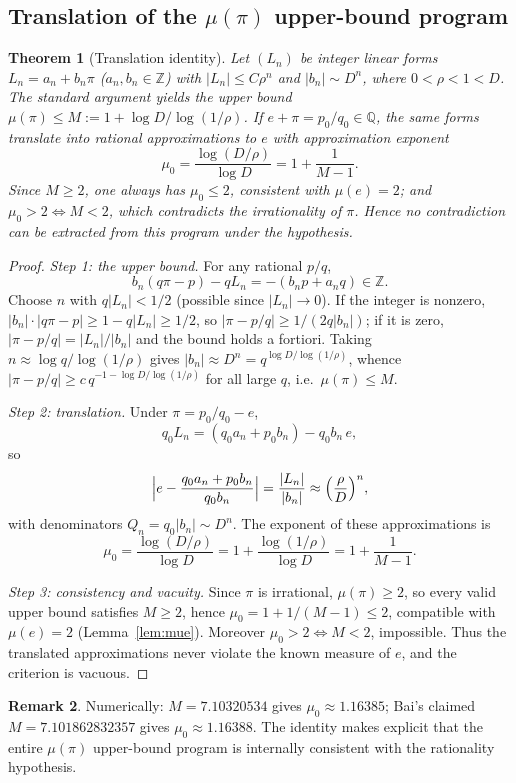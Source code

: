 \documentclass[11pt]{amsart}
\newtheorem{theorem}{Theorem}[section]
\theoremstyle{definition}
\newtheorem{remark}[theorem]{Remark}
\theoremstyle{remark}
\numberwithin{equation}{section}
\newcommand{\Q}{\mathbb{Q}}
\newcommand{\Z}{\mathbb{Z}}
\newcommand{\irr}{\mu}
\newcommand{\ee}{e}
\begin{document}
\subsection{Translation of the \texorpdfstring{$\irr(\pi)$}{mu(pi)} upper-bound program}

\begin{theorem}[Translation identity]\label{thm:translation}
Let $(L_n)$ be integer linear forms $L_n=a_n+b_n\pi$ ($a_n,b_n\in\Z$) with $|L_n|\le C\rho^n$ and $|b_n|\sim D^n$, where $0<\rho<1<D$. The standard argument yields the upper bound $\irr(\pi)\le M:=1+\log D/\log(1/\rho)$. If $e+\pi=p_0/q_0\in\Q$, the same forms translate into rational approximations to $\ee$ with approximation exponent
\[
\irr_0=\frac{\log(D/\rho)}{\log D}=1+\frac{1}{M-1}.
\]
Since $M\ge2$, one always has $\irr_0\le2$, consistent with $\irr(\ee)=2$; and $\irr_0>2\iff M<2$, which contradicts the irrationality of $\pi$. Hence no contradiction can be extracted from this program under the hypothesis.
\end{theorem}

\begin{proof}
\emph{Step 1: the upper bound.} For any rational $p/q$,
\[
b_n(q\pi-p)-qL_n=-(b_np+a_nq)\in\Z.
\]
Choose $n$ with $q|L_n|<1/2$ (possible since $|L_n|\to0$). If the integer is nonzero, $|b_n|\cdot|q\pi-p|\ge1-q|L_n|\ge1/2$, so $|\pi-p/q|\ge1/(2q|b_n|)$; if it is zero, $|\pi-p/q|=|L_n|/|b_n|$ and the bound holds a fortiori. Taking $n\approx\log q/\log(1/\rho)$ gives $|b_n|\approx D^n=q^{\log D/\log(1/\rho)}$, whence $|\pi-p/q|\ge c\,q^{-1-\log D/\log(1/\rho)}$ for all large $q$, i.e.\ $\irr(\pi)\le M$.

\emph{Step 2: translation.} Under $\pi=p_0/q_0-e$,
\[
q_0L_n=(q_0a_n+p_0b_n)-q_0b_n\,e,
\]
so
\[
\Bigl|e-\frac{q_0a_n+p_0b_n}{q_0b_n}\Bigr|=\frac{|L_n|}{|b_n|}\approx\Bigl(\frac\rho D\Bigr)^n,
\]
with denominators $Q_n=q_0|b_n|\sim D^n$. The exponent of these approximations is
\[
\irr_0=\frac{\log(D/\rho)}{\log D}=1+\frac{\log(1/\rho)}{\log D}=1+\frac1{M-1}.
\]

\emph{Step 3: consistency and vacuity.} Since $\pi$ is irrational, $\irr(\pi)\ge2$, so every valid upper bound satisfies $M\ge2$, hence $\irr_0=1+1/(M-1)\le2$, compatible with $\irr(\ee)=2$ (Lemma~\ref{lem:mue}). Moreover $\irr_0>2\iff M<2$, impossible. Thus the translated approximations never violate the known measure of $\ee$, and the criterion is vacuous.
\end{proof}

\begin{remark}
Numerically: $M=7.10320534$ gives $\irr_0\approx1.16385$; Bai's claimed $M=7.101862832357$ \cite{Bai2026} gives $\irr_0\approx1.16388$. The identity makes explicit that the entire $\irr(\pi)$ upper-bound program is internally consistent with the rationality hypothesis.
\end{remark}
\end{document}
